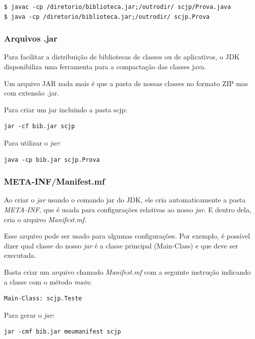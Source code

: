 \documentclass[12pt]{article}
\begin{document}
\begin{lstlisting}
$ javac -cp /diretorio/biblioteca.jar;/outrodir/ scjp/Prova.java
$ java -cp /diretorio/biblioteca.jar;/outrodir/ scjp.Prova
\end{lstlisting}

\subsubsection{Arquivos .jar}

Para facilitar a distribuição de bibliotecas de classes ou de aplicativos, o JDK disponibiliza uma ferramenta para a compactação das classes java.

Um arquivo JAR nada mais é que a pasta de nossas classes no formato ZIP mas com extensão .jar.

Para criar um jar incluindo a pasta scjp:

\begin{lstlisting}
jar -cf bib.jar scjp
\end{lstlisting}

Para utilizar o \textit{jar}:

\begin{lstlisting}
java -cp bib.jar scjp.Prova
\end{lstlisting}

\subsubsection{META-INF/Manifest.mf}

Ao criar o \textit{jar} usando o comando jar do JDK, ele cria automaticamente a pasta \textit{META-INF}, que é usada para configurações relativas ao nosso \textit{jar}. E dentro dela, cria o arquivo \textit{Manifest.mf}.

Esse arquivo pode ser usado para algumas configurações. Por exemplo, é possível dizer qual classe do nosso \textit{jar} é a classe principal (Main-Class) e que deve ser executada.

Basta criar um arquivo chamado \textit{Manifest.mf} com a seguinte instrução indicando a classe com o método \textit{main}:

\begin{lstlisting}
Main-Class: scjp.Teste
\end{lstlisting}

Para gerar o \textit{jar}:

\begin{lstlisting}
jar -cmf bib.jar meumanifest scjp
\end{lstlisting}
\end{document}
